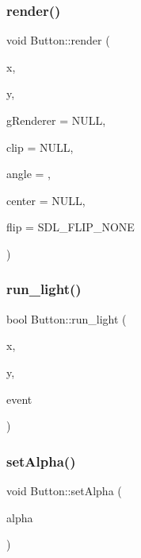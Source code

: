 \mbox{\label{class_button_a0d2179449697d361c97e533c839a87d0}} 
\subsubsection{\texorpdfstring{render()}{render()}}
{\footnotesize\ttfamily void Button\+::render (\begin{DoxyParamCaption}\item[{int}]{x,  }\item[{int}]{y,  }\item[{S\+D\+L\+\_\+\+Renderer $\ast$}]{g\+Renderer = {\ttfamily NULL},  }\item[{S\+D\+L\+\_\+\+Rect $\ast$}]{clip = {\ttfamily NULL},  }\item[{double}]{angle = {},  }\item[{S\+D\+L\+\_\+\+Point $\ast$}]{center = {\ttfamily NULL},  }\item[{S\+D\+L\+\_\+\+Renderer\+Flip}]{flip = {\ttfamily SDL\+\_\+FLIP\+\_\+NONE} }\end{DoxyParamCaption})}

\mbox{\label{class_button_aa8b6e2e47a230747970b641aa7d75de5}} 
\subsubsection{\texorpdfstring{run\+\_\+light()}{run\_light()}}
{\footnotesize\ttfamily bool Button\+::run\+\_\+light (\begin{DoxyParamCaption}\item[{int}]{x,  }\item[{int}]{y,  }\item[{S\+D\+L\+\_\+\+Event}]{event }\end{DoxyParamCaption})}

\mbox{\label{class_button_aa2fa8986d2d5c2e44d8c17373863a5fa}} 
\subsubsection{\texorpdfstring{set\+Alpha()}{setAlpha()}}
{\footnotesize\ttfamily void Button\+::set\+Alpha (\begin{DoxyParamCaption}\item[{Uint8}]{alpha }\end{DoxyParamCaption})}

